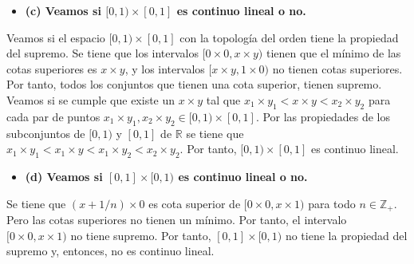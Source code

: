 \documentclass{article}
\begin{document}
\begin{itemize}
\item \bf (c) \rm Veamos si $ [0,1)\times [0,1]$ es continuo lineal o no.
\end{itemize}
Veamos si el espacio $[0,1)\times [0,1]$ con la topología del orden tiene la propiedad del supremo. Se tiene que los intervalos $[0\times 0, x\times y)$ tienen que el mínimo de las cotas superiores es $x\times y$, y los intervalos $[x\times y, 1\times 0)$ no tienen cotas superiores. Por tanto, todos los conjuntos que tienen una cota superior, tienen supremo. Veamos si se cumple que existe un $x\times y$ tal que $x_1\times y_1<x\times y< x_2\times y_2$ para cada par de puntos  $x_1\times y_1, x_2\times y_2\in [0,1)\times [0,1]$. Por las propiedades de los subconjuntos de $[0,1)$ y $[0,1]$ de $\mathbb{R}$ se tiene que  $x_1\times y_1<x_1\times y < x_1\times y_2 < x_2\times y_2$. Por tanto, $[0,1)\times [0,1]$ es continuo lineal.
\begin{itemize}
\item \bf (d) \rm Veamos si $ [0,1]\times [0,1)$ es continuo lineal o no.
\end{itemize}
Se tiene que $(x+1/n)\times 0$ es cota superior de $[0\times 0,x\times 1)$ para todo $n\in \mathbb{Z}_+$. Pero las cotas superiores no tienen un mínimo. Por tanto,  el intervalo $[0\times 0,x\times 1)$ no tiene supremo. Por tanto, $[0,1]\times [0,1)$ no tiene la propiedad del supremo y, entonces, no es continuo lineal.
\end{document}
